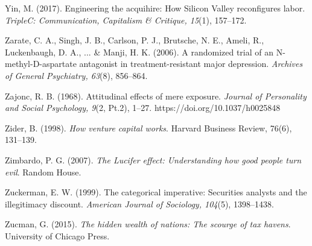 \begin{thebibliography}{}


    Yin, M. (2017). Engineering the acquihire: How Silicon Valley reconfigures labor. \textit{TripleC: Communication, Capitalism \& Critique, 15}(1), 157–172.


    Zarate, C. A., Singh, J. B., Carlson, P. J., Brutsche, N. E., Ameli, R., Luckenbaugh, D. A., ... \& Manji, H. K. (2006). A randomized trial of an N-methyl-D-aspartate antagonist in treatment-resistant major depression. \textit{Archives of General Psychiatry, 63}(8), 856–864.

    Zajonc, R. B. (1968). Attitudinal effects of mere exposure. \textit{Journal of Personality and Social Psychology, 9}(2, Pt.2), 1--27. https://doi.org/10.1037/h0025848

    Zider, B. (1998). \textit{How venture capital works}. Harvard Business Review, 76(6), 131–139.

    Zimbardo, P. G. (2007). \textit{The Lucifer effect: Understanding how good people turn evil}. Random House.

    Zuckerman, E. W. (1999). The categorical imperative: Securities analysts and the illegitimacy discount. \textit{American Journal of Sociology, 104}(5), 1398–1438.

    Zucman, G. (2015). \textit{The hidden wealth of nations: The scourge of tax havens}. University of Chicago Press.

    

    



    

    
    
   
    
    
     
    
    
    
    
    
    
    
    
    
     
    
     
    

    
    
    
    
        
    
    
    

\end{thebibliography}
